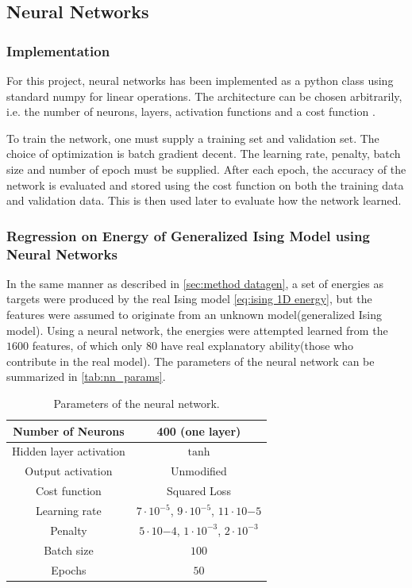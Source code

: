 \subsection{Neural Networks}\label{sec:method NN}
\subsubsection{Implementation}
For this project, neural networks has been implemented as a python class using standard numpy for linear operations. The architecture can be chosen arbitrarily, i.e. the number of neurons, layers, activation functions and a cost function .

To train the network, one must supply a training set and validation set. The choice of optimization is batch gradient decent. The learning rate, penalty, batch size and number of epoch must be supplied. After each epoch, the accuracy of the network is evaluated and stored using the cost function on both the training data and validation data. This is then used later to evaluate how the network learned.

\subsubsection{Regression on Energy of Generalized Ising Model using Neural 
Networks}

In the same manner as described in \autoref{sec:method datagen}, a set of energies 
as targets were produced by the real Ising model \autoref{eq:ising 1D energy}, but the features were assumed to originate from an unknown model(generalized Ising model). Using a neural network, the energies were attempted learned from the $1600$ features, of which only $80$ have real explanatory ability(those who contribute in the real model). The parameters of the neural network can be summarized in \autoref{tab:nn_params}.


\begin{table}[H]
\caption{Parameters of the neural network.}
\centering
{}
\begin{tabular}{c|c}
\hline
\hline
Number of Neurons & 400 (one layer)  \\ \hline
Hidden layer activation & $\tanh$   \\ \hline
Output activation & Unmodified  \\ \hline
Cost function & Squared Loss \\ \hline
Learning rate & $7\cdot 10^{-5}$, $9 \cdot 10^{-5}$, $11 \cdot 10{-5}$  \\ \hline
Penalty & $5 \cdot 10{-4}$, $1 \cdot 10^{-3}$, $2 \cdot 10^{-3}$  \\ \hline
Batch size & $100$  \\ \hline
Epochs & $50$  \\ 
\hline
\hline
\end{tabular}
\label{tab:nn_params}
\end{table}

